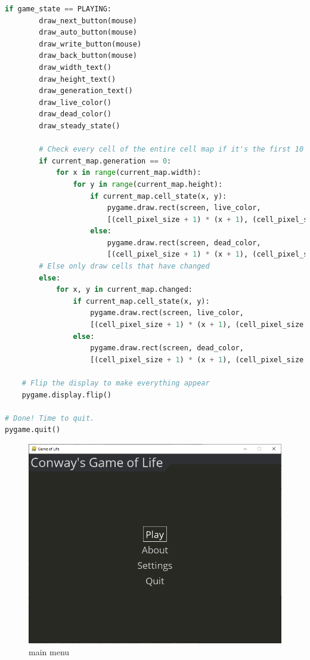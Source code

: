 \documentclass[12pt]{report}
\begin{document}
\begin{lstlisting}[language=Python, caption=game\_of\_life.py]
    if game_state == PLAYING:
        draw_next_button(mouse)
        draw_auto_button(mouse)
        draw_write_button(mouse)
        draw_back_button(mouse)
        draw_width_text()
        draw_height_text()
        draw_generation_text()
        draw_live_color()
        draw_dead_color()
        draw_steady_state()

        # Check every cell of the entire cell map if it's the first 10 iterations
        if current_map.generation == 0:
            for x in range(current_map.width):
                for y in range(current_map.height):
                    if current_map.cell_state(x, y):
                        pygame.draw.rect(screen, live_color, 
                        [(cell_pixel_size + 1) * (x + 1), (cell_pixel_size + 1) * (y + 1), cell_pixel_size, cell_pixel_size])
                    else:
                        pygame.draw.rect(screen, dead_color, 
                        [(cell_pixel_size + 1) * (x + 1), (cell_pixel_size + 1) * (y + 1), cell_pixel_size, cell_pixel_size])
        # Else only draw cells that have changed
        else:
            for x, y in current_map.changed:
                if current_map.cell_state(x, y):
                    pygame.draw.rect(screen, live_color, 
                    [(cell_pixel_size + 1) * (x + 1), (cell_pixel_size + 1) * (y + 1), cell_pixel_size, cell_pixel_size])
                else:
                    pygame.draw.rect(screen, dead_color, 
                    [(cell_pixel_size + 1) * (x + 1), (cell_pixel_size + 1) * (y + 1), cell_pixel_size, cell_pixel_size])

    # Flip the display to make everything appear
    pygame.display.flip()

# Done! Time to quit.
pygame.quit()

\end{lstlisting}

\begin{figure}[h]
    \centering
    \includegraphics[width=\textwidth]{mainmenu}
    \caption{main menu}
\end{figure}
\end{document}
